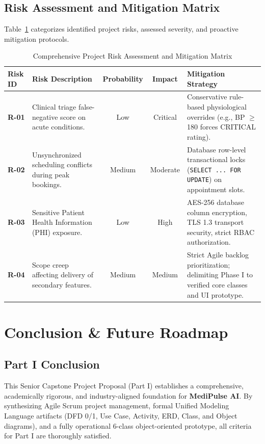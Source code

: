 \documentclass[11pt,a4paper]{article}
\begin{document}
\subsection{Risk Assessment and Mitigation Matrix}
Table~\ref{tab:risk_matrix} categorizes identified project risks, assessed severity, and proactive mitigation protocols.

\begin{table}[H]
\centering
\caption{Comprehensive Project Risk Assessment and Mitigation Matrix}
\label{tab:risk_matrix}
\small
\begin{tabularx}{\textwidth}{lp{3.5cm}ccX}
\toprule
\textbf{Risk ID} & \textbf{Risk Description} & \textbf{Probability} & \textbf{Impact} & \textbf{Mitigation Strategy} \\
\midrule
\textbf{R-01} & Clinical triage false-negative score on acute conditions. & Low & Critical & Conservative rule-based physiological overrides (e.g., BP $\ge$ 180 forces CRITICAL rating). \\
\textbf{R-02} & Unsynchronized scheduling conflicts during peak bookings. & Medium & Moderate & Database row-level transactional locks (\texttt{SELECT ... FOR UPDATE}) on appointment slots. \\
\textbf{R-03} & Sensitive Patient Health Information (PHI) exposure. & Low & High & AES-256 database column encryption, TLS 1.3 transport security, strict RBAC authorization. \\
\textbf{R-04} & Scope creep affecting delivery of secondary features. & Medium & Medium & Strict Agile backlog prioritization; delimiting Phase I to verified core classes and UI prototype. \\
\bottomrule
\end{tabularx}
\end{table}

\section{Conclusion \& Future Roadmap}

\subsection{Part I Conclusion}
This Senior Capstone Project Proposal (Part I) establishes a comprehensive, academically rigorous, and industry-aligned foundation for \textbf{MediPulse AI}. By synthesizing Agile Scrum project management, formal Unified Modeling Language artifacts (DFD 0/1, Use Case, Activity, ERD, Class, and Object diagrams), and a fully operational 6-class object-oriented prototype, all criteria for Part I are thoroughly satisfied.
\end{document}
